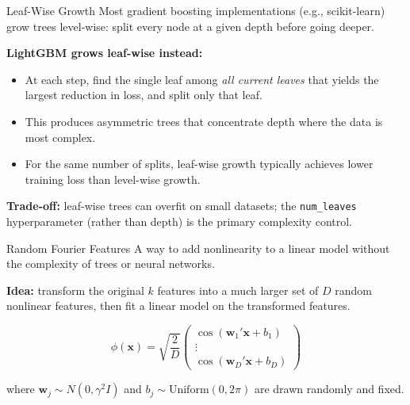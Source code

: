 \documentclass[aspectratio=169,t]{beamer}
\begin{document}
\begin{frame}{Leaf-Wise Growth}
Most gradient boosting implementations (e.g., scikit-learn) grow trees \alert{level-wise}: split every node at a given depth before going deeper.

\vspace{0.3cm}
\textbf{LightGBM grows leaf-wise instead:}
\begin{itemize}
\item At each step, find the single leaf among \emph{all current leaves} that yields the largest reduction in loss, and split only that leaf.
\item This produces \alert{asymmetric trees} that concentrate depth where the data is most complex.
\item For the same number of splits, leaf-wise growth typically achieves lower training loss than level-wise growth.
\end{itemize}

\vspace{0.3cm}
\textbf{Trade-off:} leaf-wise trees can overfit on small datasets; the \texttt{num\_leaves} hyperparameter (rather than depth) is the primary complexity control.
\end{frame}


\begin{frame}{Random Fourier Features}
A way to add nonlinearity to a linear model without the complexity of trees or neural networks.
\vspace{0.3cm}

\textbf{Idea:} transform the original $k$ features into a much larger set of $D$ random nonlinear features, then fit a linear model on the transformed features.

\[
\phi(\mathbf{x}) = \sqrt{\frac{2}{D}} \begin{pmatrix} \cos(\mathbf{w}_1'\mathbf{x} + b_1) \\ \vdots \\ \cos(\mathbf{w}_D'\mathbf{x} + b_D) \end{pmatrix}
\]

where $\mathbf{w}_j \sim N(0, \gamma^2 I)$ and $b_j \sim \text{Uniform}(0, 2\pi)$ are drawn \alert{randomly and fixed}.
\end{frame}
\end{document}
